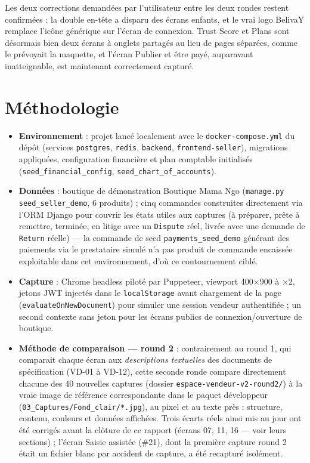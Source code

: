 \documentclass[11pt]{article}
\begin{document}
Les deux corrections demandées par l'utilisateur entre les deux rondes restent confirmées : la double en-tête a disparu des écrans enfants, et le vrai logo BelivaY remplace l'icône générique sur l'écran de connexion. Trust Score et Plans sont désormais bien deux écrans à onglets partagés au lieu de pages séparées, comme le prévoyait la maquette, et l'écran \og Publier et être payé\fg{}, auparavant inatteignable, est maintenant correctement capturé.


\section*{Méthodologie}
\begin{itemize}
  \item \textbf{Environnement} : projet lancé localement avec le \texttt{docker-compose.yml} du dépôt (services \texttt{postgres}, \texttt{redis}, \texttt{backend}, \texttt{frontend-seller}), migrations appliquées, configuration financière et plan comptable initialisés (\texttt{seed\_financial\_config}, \texttt{seed\_chart\_of\_accounts}).
  \item \textbf{Données} : boutique de démonstration \og Boutique Mama Ngo\fg{} (\texttt{manage.py seed\_seller\_demo}, 6 produits) ; cinq commandes construites directement via l'ORM Django pour couvrir les états utiles aux captures (à préparer, prête à remettre, terminée, en litige avec un \texttt{Dispute} réel, livrée avec une demande de \texttt{Return} réelle) — la commande de seed \texttt{payments\_seed\_demo} générant des paiements via le prestataire simulé n'a pas produit de commande encaissée exploitable dans cet environnement, d'où ce contournement ciblé.
  \item \textbf{Capture} : Chrome headless piloté par Puppeteer, viewport 400×900 à ×2, jetons JWT injectés dans le \texttt{localStorage} avant chargement de la page (\texttt{evaluateOnNewDocument}) pour simuler une session vendeur authentifiée ; un second contexte sans jeton pour les écrans publics de connexion/ouverture de boutique.
  \item \textbf{Méthode de comparaison — round 2} : contrairement au round 1, qui comparait chaque écran aux \emph{descriptions textuelles} des documents de spécification (VD-01 à VD-12), cette seconde ronde compare directement chacune des 40 nouvelles captures (dossier \texttt{espace-vendeur-v2-round2/}) à la vraie image de référence correspondante dans le paquet développeur (\texttt{03\_Captures/Fond\_clair/*.jpg}), au pixel et au texte près : structure, contenu, couleurs et données affichées. Trois écarts réels ainsi mis au jour ont été corrigés avant la clôture de ce rapport (écrans 07, 11, 16 — voir leurs sections) ; l'écran \og Saisie assistée\fg{} (\#21), dont la première capture round 2 était un fichier blanc par accident de capture, a été recapturé isolément.

\end{itemize}
\end{document}
